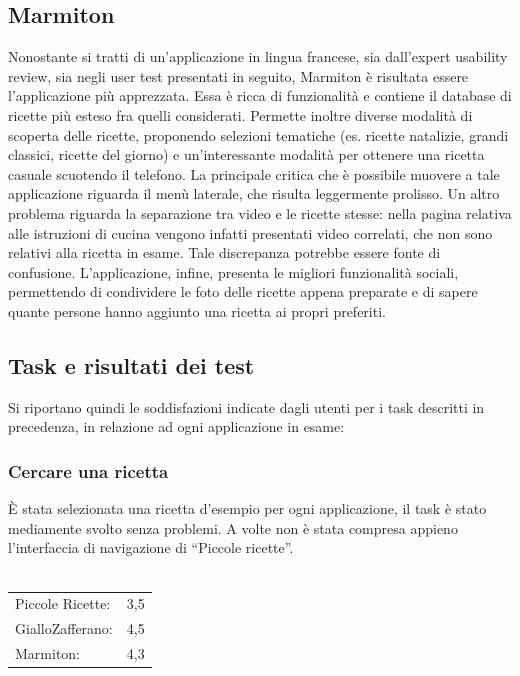 \subsection{Marmiton}
Nonostante si tratti di un'applicazione in lingua francese, sia dall'expert
usability review, sia negli user test presentati in seguito, Marmiton è
risultata essere l'applicazione più apprezzata.  Essa è ricca di funzionalità e
contiene il database di ricette più esteso fra quelli considerati.  Permette
inoltre diverse modalità di scoperta delle ricette, proponendo
selezioni tematiche (es. ricette natalizie, grandi classici, ricette del giorno)
e un'interessante modalità per ottenere una ricetta casuale scuotendo il telefono.
La principale critica che è possibile muovere a tale
applicazione riguarda il menù laterale, che risulta leggermente prolisso. Un
altro problema riguarda la separazione tra video e le ricette stesse: nella
pagina relativa alle istruzioni di cucina vengono infatti presentati video correlati, che
non sono relativi alla ricetta in esame. Tale discrepanza potrebbe essere fonte di confusione.
L'applicazione, infine, presenta le migliori funzionalità sociali, permettendo di
condividere le foto delle ricette appena preparate e
di sapere quante persone hanno aggiunto una ricetta ai propri
preferiti.



\subsection{Task e risultati dei test}
Si riportano quindi le soddisfazioni indicate dagli utenti
per i task descritti in precedenza, in relazione ad ogni applicazione in esame:

\subsubsection{Cercare una ricetta}
È stata selezionata una ricetta d'esempio per ogni applicazione, il task è stato
mediamente svolto senza problemi.  A volte non è stata compresa appieno
l'interfaccia di navigazione di ``Piccole ricette''.\\\\
\begin{tabular}{l c}
Piccole Ricette: & 3,5\\
GialloZafferano: & 4,5\\
Marmiton: & 4,3\\
\end{tabular}

